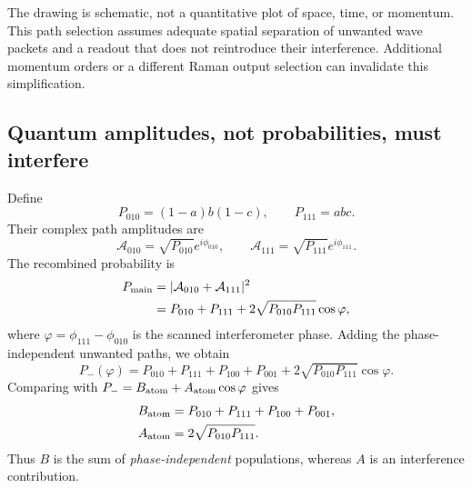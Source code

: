 \documentclass[11pt,a4paper]{article}
\numberwithin{equation}{section}
\begin{document}
\begin{center}
\end{center}
The drawing is schematic, not a quantitative plot of space, time, or momentum.
This path selection assumes adequate spatial separation of unwanted
wave packets and a readout that does not reintroduce their interference.
Additional momentum orders or a different Raman output selection can invalidate
this simplification.

\subsection{Quantum amplitudes, not probabilities, must interfere}

Define
\begin{equation}
 P_{010}=(1-a)b(1-c),\qquad P_{111}=abc.
\end{equation}
Their complex path amplitudes are
\begin{equation}
\mathcal A_{010}=\sqrt{P_{010}}e^{i\phi_{010}},\qquad
\mathcal A_{111}=\sqrt{P_{111}}e^{i\phi_{111}}.
\end{equation}
The recombined probability is
\begin{align}
P_{\rm main}
 &=|\mathcal A_{010}+\mathcal A_{111}|^2\\
 &=P_{010}+P_{111}+2\sqrt{P_{010}P_{111}}\cos\varphi,
\end{align}
where $\varphi=\phi_{111}-\phi_{010}$ is the scanned interferometer phase.
Adding the phase-independent unwanted paths, we obtain
\begin{equation}\label{eq:singlefringe}
P_-(\varphi)=P_{010}+P_{111}+P_{100}+P_{001}
+2\sqrt{P_{010}P_{111}}\cos\varphi.
\end{equation}
Comparing with $P_-=B_{\rm atom}+A_{\rm atom}\cos\varphi$ gives
\begin{align}
 B_{\rm atom}&=P_{010}+P_{111}+P_{100}+P_{001},\label{eq:bsum}\\
 A_{\rm atom}&=2\sqrt{P_{010}P_{111}}.\label{eq:asum}
\end{align}
Thus $B$ is the sum of \emph{phase-independent} populations, whereas $A$ is
an interference contribution.
\end{document}
